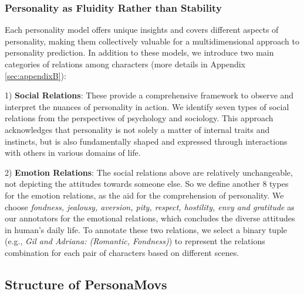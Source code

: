 \subsubsection{Personality as Fluidity Rather than Stability}

Each personality model offers unique insights and covers different aspects of personality, making them collectively valuable for a multidimensional approach to personality prediction. In addition to these models, we introduce two main categories of relations among characters (more details in Appendix \ref{sec:appendixB}):

1) \textbf{Social Relations}: These provide a comprehensive framework to observe and interpret the nuances of personality in action. We identify seven types of social relations from the perspectives of psychology and sociology. This approach acknowledges that personality is not solely a matter of internal traits and instincts, but is also fundamentally shaped and expressed through interactions with others in various domains of life.

2) \textbf{Emotion Relations}: The social relations above are relatively unchangeable, not depicting the attitudes towards someone else. So we define another 8 types for the emotion relations, as the aid for the comprehension of personality. We choose \textit{fondness, jealousy, aversion, pity, respect, hostility, envy and gratitude} as our annotators for the emotional relations, which concludes the diverse attitudes in human's daily life. To annotate these two relations, we select a binary tuple (e.g., \textit{Gil and Adriana: (Romantic, Fondness)}) to represent the relations combination for each pair of characters based on different scenes.


\subsection{Structure of PersonaMovs}

